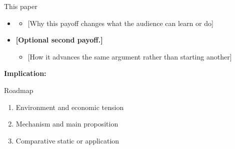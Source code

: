 \documentclass[11pt, aspectratio=169]{beamer}
\begin{document}
\begin{frame}{This paper}
  \bigskip
  \begin{itemize}\setlength{\itemsep}{1.0em}
    \item {} \ResultHeadlineSlide
      \vspace{0.14em}
      \begin{itemize}\setlength{\itemsep}{0.38em}
        \item {[Why this payoff changes what the audience can learn or do]}
      \end{itemize}
    \item \textbf{[Optional second payoff.]} \ResultSupportSlide
      \vspace{0.14em}
      \begin{itemize}\setlength{\itemsep}{0.38em}
        \item {[How it advances the same argument rather than starting another]}
      \end{itemize}
  \end{itemize}

  \bigskip
  \textbf{Implication:} \ResultImplicationSlide
\end{frame}

\begin{frame}{Roadmap}
  \begin{enumerate}\setlength{\itemsep}{1.1em}
    \item Environment and economic tension
    \item Mechanism and main proposition
    \item Comparative static or application
  \end{enumerate}
\end{frame}
\end{document}
